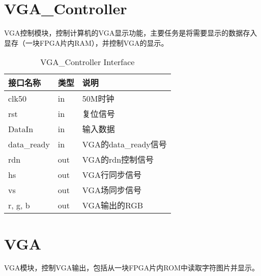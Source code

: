 
\section{VGA\_Controller}

VGA控制模块，控制计算机的VGA显示功能，主要任务是将需要显示的数据存入显存（一块FPGA片内RAM），并控制VGA的显示。

\begin{center}
\renewcommand{\arraystretch}{1.3}
\small
\begin{longtable}{|p{3cm}<{\centering}|p{1.4cm}<{\centering}|p{7cm}<{\centering}|}
\caption{VGA\_Controller Interface}
\label{tab:treatments}\\
\hline
接口名称 & 类型 & 说明 \\\hline
clk50 & in & 50M时钟 \\\hline
rst & in  & 复位信号 \\\hline
DataIn & in  & 输入数据 \\\hline
data\_ready & in & VGA的data\_ready信号\\\hline
rdn & out  & VGA的rdn控制信号 \\\hline
hs & out & VGA行同步信号\\\hline
vs & out & VGA场同步信号\\\hline
r, g, b & out & VGA输出的RGB \\\hline
\end{longtable}
\end{center}


\section{VGA}

VGA模块，控制VGA输出，包括从一块FPGA片内ROM中读取字符图片并显示。


